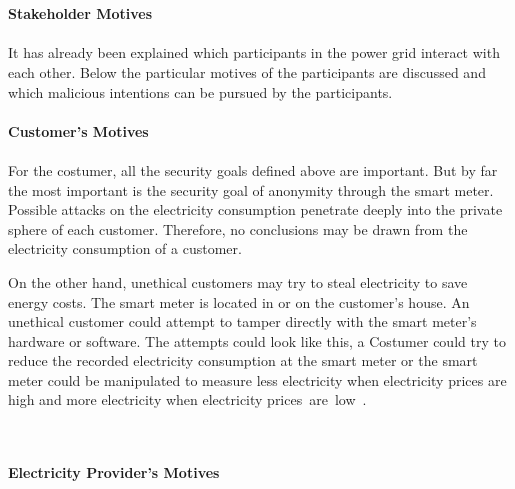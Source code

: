 \\
\\
\textbf{Stakeholder Motives}
\\
\\
It has already been explained which participants in the power grid interact with each other. %
Below the particular motives of the participants are discussed and which malicious intentions can be pursued by the participants.
\\
\\
\textbf{Customer's Motives}
\\
\\
For the costumer, all the security goals defined above are important. But by far the most important is the security goal of anonymity through the smart meter. Possible attacks on the electricity consumption penetrate deeply into the private sphere of each customer. Therefore, no conclusions may be drawn from the electricity consumption of a customer.\\
\begin{samepage}\enlargethispage{\baselineskip}On the other hand, unethical customers may try to steal electricity to save energy costs. The smart meter is located in or on the customer's house. An unethical customer could attempt to tamper directly with the smart meter's hardware or software. The attempts could look like this, a Costumer could try to reduce the recorded electricity consumption at the smart meter or the smart meter could be manipulated to measure less electricity when electricity prices are high and more electricity when electricity \nopagebreak prices~are~low~\cite{lemay2007unified}.\nopagebreak
\end{samepage}
\\
\\
\textbf{Electricity Provider's Motives}
\\
\\
